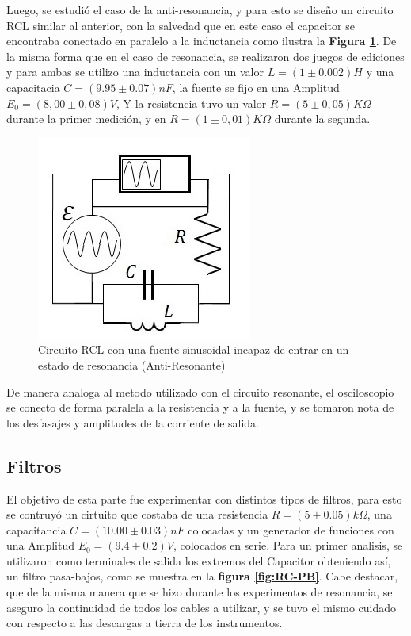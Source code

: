 \documentclass[11pt,a4paper]{article}
\begin{document}
Luego, se estudió el caso de la anti-resonancia, y para esto se diseño un circuito RCL similar al anterior, con la salvedad que en este caso el capacitor se encontraba conectado en paralelo a la inductancia como ilustra la \textbf{Figura \ref{fig:RCL-ARes}}. De la misma forma que en el caso de resonancia, se realizaron dos juegos de ediciones y para ambas se utilizo una inductancia con un valor $L = (1 \pm0.002)H$ y una capacitacia $C = (9.95 \pm 0.07)nF$, la fuente se fijo en una Amplitud $E_{0} = (8,00 \pm 0,08)V$, Y la resistencia tuvo un valor $R = (5 \pm 0,05)K\Omega$ durante la primer medición, y en $R = (1 \pm 0,01)K\Omega$ durante la segunda.

\begin{figure}[h]
\centering
\includegraphics[scale=0.7]{Circuito-RCL-AntiResonante}
  \caption{Circuito RCL con una fuente sinusoidal incapaz de entrar en un estado de resonancia (Anti-Resonante)}
  \label{fig:RCL-ARes}
\end{figure}

De manera analoga al metodo utilizado con el circuito resonante, el osciloscopio se conecto de forma paralela a la resistencia y a la fuente, y se tomaron nota de los desfasajes y amplitudes de la corriente de salida.


\subsection{Filtros}

El objetivo de esta parte fue experimentar con distintos tipos de filtros, para esto se contruyó un cirtuito que costaba de una resistencia $R = (5 \pm 0.05)k\Omega$, una capacitancia $C = (10.00 \pm 0.03)nF$ colocadas y un generador de funciones con una Amplitud $E_{0} = (9.4 \pm 0.2)V$, colocados en serie. Para un primer analisis, se utilizaron como terminales de salida los extremos del Capacitor obteniendo así, un filtro pasa-bajos, como se muestra en la \textbf{figura \ref{fig:RC-PB}}. Cabe destacar, que de la misma manera que se hizo durante los experimentos de resonancia, se aseguro la continuidad de todos los cables a utilizar, y se tuvo el mismo cuidado con respecto a las descargas a tierra de los instrumentos.
\end{document}
